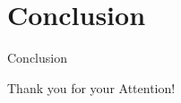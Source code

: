 \documentclass[16pt]{beamer}
\begin{document}
\section{Conclusion}
\begin{frame}[t]{Conclusion}
\end{frame}

\begin{frame}[c]{}
\begin{center}
Thank you for your Attention!
\end{center}
\end{frame}
\end{document}
